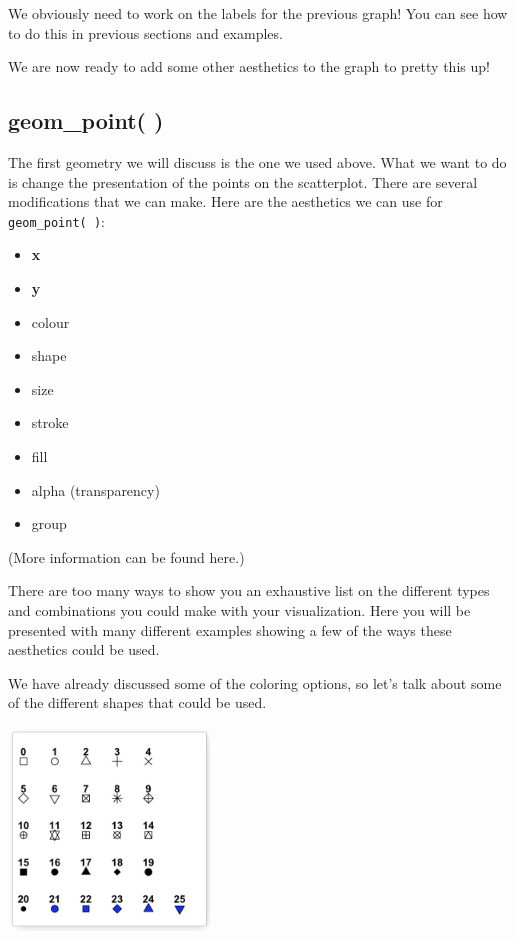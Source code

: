 \documentclass[
  letterpaper,
  DIV=11,
  numbers=noendperiod]{scrreprt}
\begin{document}
We obviously need to work on the labels for the previous graph! You can
see how to do this in previous sections and examples.

We are now ready to add some other aesthetics to the graph to pretty
this up!

\subsection*{geom\_point( )}\label{geom_point}

The first geometry we will discuss is the one we used above. What we
want to do is change the presentation of the points on the scatterplot.
There are several modifications that we can make. Here are the
aesthetics we can use for \texttt{geom\_point(\ )}:

\begin{itemize}
\item
  \textbf{x}
\item
  \textbf{y}
\item
  colour
\item
  shape
\item
  size
\item
  stroke
\item
  fill
\item
  alpha (transparency)
\item
  group
\end{itemize}

(More information can be found here.)

There are too many ways to show you an exhaustive list on the different
types and combinations you could make with your visualization. Here you
will be presented with many different examples showing a few of the ways
these aesthetics could be used.

We have already discussed some of the coloring options, so let's talk
about some of the different shapes that could be used.

\includegraphics[width=0.4\textwidth,height=\textheight]{./images/AST_2.jpg}
\end{document}
